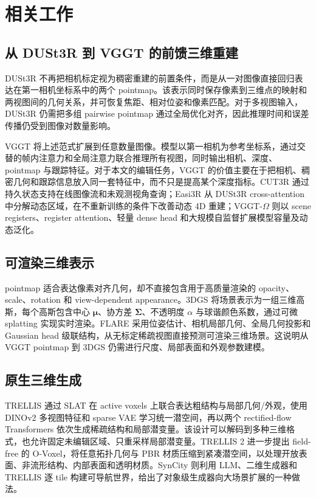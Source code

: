 \section{相关工作}

\subsection{从 DUSt3R 到 VGGT 的前馈三维重建}

DUSt3R 不再把相机标定视为稠密重建的前置条件，而是从一对图像直接回归表达在第一相机坐标系中的两个 pointmap\cite{dust3r}。该表示同时保存像素到三维点的映射和两视图间的几何关系，并可恢复焦距、相对位姿和像素匹配。对于多视图输入，DUSt3R 仍需把多组 pairwise pointmap 通过全局优化对齐，因此推理时间和误差传播仍受到图像对数量影响。

VGGT 将上述范式扩展到任意数量图像。模型以第一相机为参考坐标系，通过交替的帧内注意力和全局注意力联合推理所有视图，同时输出相机、深度、pointmap 与跟踪特征\cite{vggt}。对于本文的编辑任务，VGGT 的价值主要在于把相机、稠密几何和跟踪信息放入同一套特征中，而不只是提高某个深度指标。CUT3R 通过持久状态支持在线图像流和未观测视角查询\cite{cut3r}；Easi3R 从 DUSt3R cross-attention 中分解动态区域，在不重新训练的条件下改善动态 4D 重建\cite{easi3r}；VGGT-$\Omega$ 则以 scene registers、register attention、轻量 dense head 和大规模自监督扩展模型容量及动态泛化\cite{vggtomega}。

\subsection{可渲染三维表示}

pointmap 适合表达像素对齐几何，却不直接包含用于高质量渲染的 opacity、scale、rotation 和 view-dependent appearance。3DGS 将场景表示为一组三维高斯，每个高斯包含中心 $\boldsymbol{\mu}$、协方差 $\boldsymbol{\Sigma}$、不透明度 $\alpha$ 与球谐颜色系数，通过可微 splatting 实现实时渲染\cite{3dgs}。FLARE 采用位姿估计、相机局部几何、全局几何投影和 Gaussian head 级联结构，从无标定稀疏视图直接预测可渲染三维场景\cite{flare}。这说明从 VGGT pointmap 到 3DGS 仍需进行尺度、局部表面和外观参数建模。

\subsection{原生三维生成}

TRELLIS 通过 SLAT 在 active voxels 上联合表达粗结构与局部几何/外观，使用 DINOv2 多视图特征和 sparse VAE 学习统一潜空间，再以两个 rectified-flow Transformers 依次生成稀疏结构和局部潜变量\cite{trellis}。该设计可以解码到多种三维格式，也允许固定未编辑区域、只重采样局部潜变量。TRELLIS 2 进一步提出 field-free 的 O-Voxel，将任意拓扑几何与 PBR 材质压缩到紧凑潜空间，以处理开放表面、非流形结构、内部表面和透明材质\cite{trellis2}。SynCity 则利用 LLM、二维生成器和 TRELLIS 逐 tile 构建可导航世界，给出了对象级生成器向大场景扩展的一种做法\cite{syncity}。

